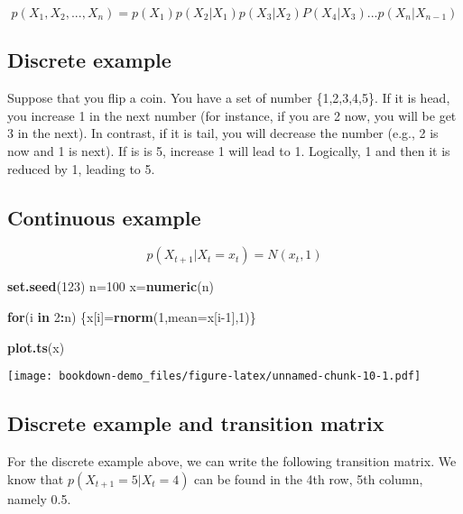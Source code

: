 \documentclass[]{book}
\newenvironment{Shaded}{\begin{snugshade}}{\end{snugshade}}
\newcommand{\ControlFlowTok}[1]{\textcolor[rgb]{0.13,0.29,0.53}{\textbf{#1}}}
\newcommand{\DataTypeTok}[1]{\textcolor[rgb]{0.13,0.29,0.53}{#1}}
\newcommand{\DecValTok}[1]{\textcolor[rgb]{0.00,0.00,0.81}{#1}}
\newcommand{\KeywordTok}[1]{\textcolor[rgb]{0.13,0.29,0.53}{\textbf{#1}}}
\newcommand{\NormalTok}[1]{#1}
\newcommand{\OperatorTok}[1]{\textcolor[rgb]{0.81,0.36,0.00}{\textbf{#1}}}
\begin{document}
\[p(X_1,X_2,...,X_n)=p(X_1)p(X_2|X_1)p(X_3|X_2)P(X_4|X_3)...p(X_n|X_{n-1})\]

\hypertarget{discrete-example}{%
\subsection{Discrete example}\label{discrete-example}}

Suppose that you flip a coin. You have a set of number \{1,2,3,4,5\}. If it is head, you increase 1 in the next number (for instance, if you are 2 now, you will be get 3 in the next). In contrast, if it is tail, you will decrease the number (e.g., 2 is now and 1 is next). If is is 5, increase 1 will lead to 1. Logically, 1 and then it is reduced by 1, leading to 5.

\hypertarget{continuous-example}{%
\subsection{Continuous example}\label{continuous-example}}

\[p(X_{t+1}| X_t=x_t)=N(x_t,1)\]

\begin{Shaded}
\begin{Highlighting}[]
\KeywordTok{set.seed}\NormalTok{(}\DecValTok{123}\NormalTok{)}
\NormalTok{n=}\DecValTok{100}
\NormalTok{x=}\KeywordTok{numeric}\NormalTok{(n)}

\ControlFlowTok{for}\NormalTok{(i }\ControlFlowTok{in} \DecValTok{2}\OperatorTok{:}\NormalTok{n)}
\NormalTok{\{x[i]=}\KeywordTok{rnorm}\NormalTok{(}\DecValTok{1}\NormalTok{,}\DataTypeTok{mean=}\NormalTok{x[i}\DecValTok{-1}\NormalTok{],}\DecValTok{1}\NormalTok{)\}}

\KeywordTok{plot.ts}\NormalTok{(x)}
\end{Highlighting}
\end{Shaded}

\texttt{[image: bookdown-demo\_files/figure-latex/unnamed-chunk-10-1.pdf]}

\hypertarget{discrete-example-and-transition-matrix}{%
\subsection{Discrete example and transition matrix}\label{discrete-example-and-transition-matrix}}

For the discrete example above, we can write the following transition matrix. We know that \(p(X_{t+1}=5 | X_t=4)\) can be found in the 4th row, 5th column, namely 0.5.
\end{document}
